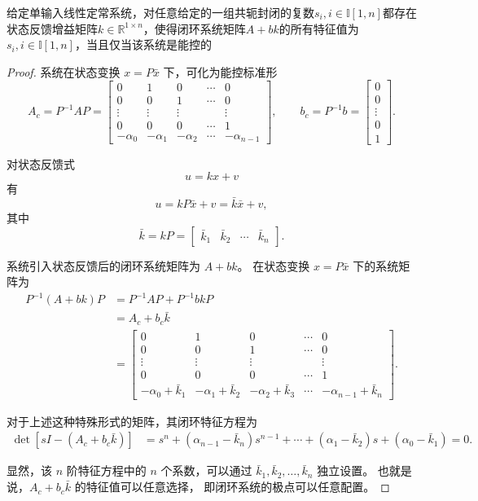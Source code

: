 \begin{theorem}
    给定单输入线性定常系统，对任意给定的一组共轭封闭的复数$s_i,i\in \mathbb{I}[1,n]$都存在状态反馈增益矩阵$k\in \mathbb{R}^{1 \times n}$，使得闭环系统矩阵$A + bk$的所有特征值为$s_i,i\in \mathbb{I}[1,n]$，当且仅当该系统是能控的
    \begin{proof}
    系统在状态变换 $x=P\bar{x}$ 下，可化为能控标准形
    \[
    A_c=P^{-1}AP=
    \begin{bmatrix}
    0&1&0&\cdots&0\\
    0&0&1&\cdots&0\\
    \vdots&\vdots&\vdots&&\vdots\\
    0&0&0&\cdots&1\\
    -\alpha_0&-\alpha_1&-\alpha_2&\cdots&-\alpha_{n-1}
    \end{bmatrix},
    \qquad
    b_c=P^{-1}b=
    \begin{bmatrix}
    0\\0\\ \vdots\\0\\1
    \end{bmatrix}.
    \]

    对状态反馈式
    \[
    u=kx+v
    \]
    有
    \[
    u=kP\bar{x}+v=\bar{k}\bar{x}+v,
    \]
    其中
    \[
    \bar{k}=kP=
    \begin{bmatrix}
    \bar{k}_1&\bar{k}_2&\cdots&\bar{k}_n
    \end{bmatrix}.
    \]

    系统引入状态反馈后的闭环系统矩阵为 $A+bk$。
    在状态变换 $x=P\bar{x}$ 下的系统矩阵为
    \[
    \begin{aligned}
    P^{-1}(A+bk)P
    &=P^{-1}AP+P^{-1}bkP  \\
    &=A_c+b_c\bar{k} \\
    &=
    \begin{bmatrix}
    0&1&0&\cdots&0\\
    0&0&1&\cdots&0\\
    \vdots&\vdots&\vdots&&\vdots\\
    0&0&0&\cdots&1\\
    -\alpha_0+\bar{k}_1&
    -\alpha_1+\bar{k}_2&
    -\alpha_2+\bar{k}_3&
    \cdots&
    -\alpha_{n-1}+\bar{k}_n
    \end{bmatrix}.
    \end{aligned}
    \]

    对于上述这种特殊形式的矩阵，其闭环特征方程为
    \[
    \begin{aligned}
    \det\left[sI-\left(A_c+b_c\bar{k}\right)\right]
    &=s^n+\left(\alpha_{n-1}-\bar{k}_n\right)s^{n-1}
    +\cdots+\left(\alpha_1-\bar{k}_2\right)s
    +\left(\alpha_0-\bar{k}_1\right)=0.
    \end{aligned}
    \]

    显然，该 $n$ 阶特征方程中的 $n$ 个系数，可以通过
    $\bar{k}_1,\bar{k}_2,\ldots,\bar{k}_n$ 独立设置。
    也就是说，$A_c+b_c\bar{k}$ 的特征值可以任意选择，
    即闭环系统的极点可以任意配置。
    \end{proof}
\end{theorem}


